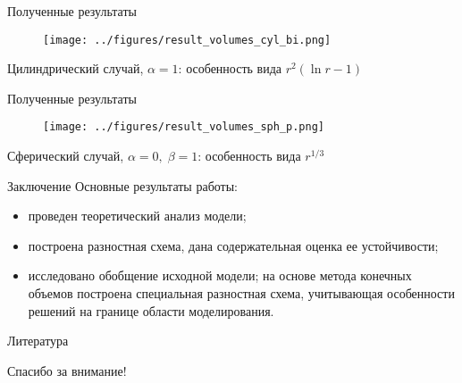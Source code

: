 \documentclass[aspectratio=169]{beamer}
\begin{document}
\begin{frame}{Полученные результаты}
\vspace{-0.6cm}
\begin{figure}
	\texttt{[image: ../figures/result\_volumes\_cyl\_bi.png]}
\end{figure}
\vspace{-0.7cm}
\begin{center}
	Цилиндрический случай, $\alpha = 1$: особенность вида $r^2 (\ln r - 1)$
\end{center}
\end{frame}


\begin{frame}{Полученные результаты}
\vspace{-0.6cm}
\begin{figure}
	\texttt{[image: ../figures/result\_volumes\_sph\_p.png]}
\end{figure}
\vspace{-0.7cm}
\begin{center}
	Сферический случай, $\alpha = 0, \; \beta = 1$: особенность вида $r^{1/3}$
\end{center}
\end{frame}


\begin{frame}{Заключение}
Основные результаты работы:
\begin{itemize}
    \item проведен теоретический анализ модели;
    \item построена разностная схема, дана содержательная оценка ее устойчивости;
    \item исследовано обобщение исходной модели; на основе метода конечных объемов построена
    специальная разностная схема, учитывающая особенности решений на границе области моделирования.
\end{itemize}
\end{frame}


\begin{frame}{Литература}
\printbibliography
\end{frame}


\begin{frame}{}
\begin{center}
	\Large
	Спасибо за внимание!
\end{center}
\end{frame}
\end{document}
